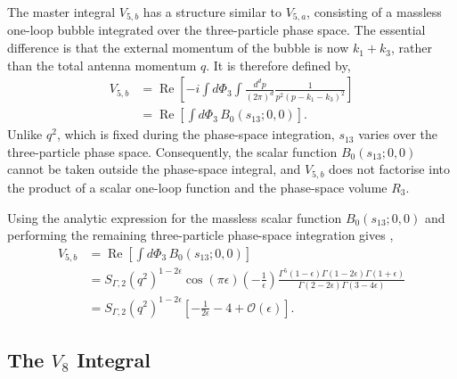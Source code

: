 The master integral $V_{5,b}$ has a structure similar to $V_{5,a}$, consisting of a massless
one-loop bubble integrated over the three-particle phase space. The essential difference is
that the external momentum of the bubble is now $k_1+k_3$, rather than the total antenna
momentum $q$. It is therefore defined by,
\begin{equation}
    \begin{split}
        V_{5,b} &= \operatorname{Re}\!\left[-i\int d\Phi_3\int\frac{d^dp}{(2\pi)^d}\frac1{p^2(p-k_1-k_3)^2}\right]\\
                &= \operatorname{Re}\!\left[\int d\Phi_3\,B_0\!\left(s_{13};0,0\right)\right].
    \end{split}
\end{equation}
Unlike $q^2$, which is fixed during the phase-space integration, $s_{13}$ varies over the
three-particle phase space. Consequently, the scalar function $B_0\!\left(s_{13};0,0\right)$
cannot be taken outside the phase-space integral, and $V_{5,b}$ does not factorise into the
product of a scalar one-loop function and the phase-space volume $R_3$.

Using the analytic expression for the massless scalar function $B_0\!\left(s_{13};0,0\right)$
and performing the remaining three-particle phase-space integration gives
\cite{Gehrmann-DeRidder:2005btv},
\begin{equation}
    \begin{split}
        V_{5,b} &= \operatorname{Re}\!\left[\int d\Phi_3\,B_0\!\left(s_{13};0,0\right)\right]\\
                &= S_{\Gamma,2}\!\left(q^2\right)^{1-2\epsilon}\cos(\pi\epsilon)\!\left(-\frac1\epsilon\right)\frac{\Gamma^5(1-\epsilon)\Gamma(1-2\epsilon)\Gamma(1+\epsilon)}{\Gamma(2-2\epsilon)\Gamma(3-4\epsilon)}\\
                &= S_{\Gamma,2}\!\left(q^2\right)^{1-2\epsilon}\!\left[-\frac1{2\epsilon}-4+\mathcal O(\epsilon)\right].
    \end{split}
\end{equation}

\subsection{The $V_8$ Integral}\label{subsubsec:V8}

